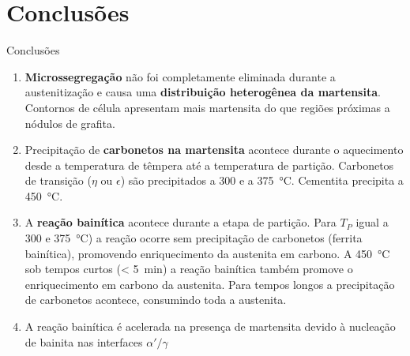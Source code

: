 \section{Conclusões}

\begin{frame}{Conclusões}

  \begin{enumerate}
    \item \textbf{Microssegregação} não foi completamente eliminada durante a austenitização e causa uma \textbf{distribuição heterogênea da martensita}. Contornos de célula apresentam mais martensita do que regiões próximas a nódulos de grafita.

    \item Precipitação de \textbf{carbonetos na martensita} acontece durante o aquecimento desde a temperatura de têmpera até a temperatura de partição. Carbonetos de transição ($\eta$ ou $\epsilon$) são precipitados a 300 e a \SI{375}{\degreeCelsius}. Cementita precipita a \SI{450}{\degreeCelsius}.

    \item A \textbf{reação bainítica} acontece durante a etapa de partição. Para $T_P$ igual a 300 e \SI{375}{\degreeCelsius}) a reação ocorre sem precipitação de carbonetos (ferrita bainítica), promovendo enriquecimento da austenita em carbono. A \SI{450}{\degreeCelsius} sob tempos curtos (< 5~min) a reação bainítica também promove o enriquecimento em carbono da austenita. Para tempos longos a precipitação de carbonetos acontece, consumindo toda a austenita.

    \item A reação bainítica é acelerada na presença de martensita devido à nucleação de bainita nas interfaces $\alpha'/\gamma$

    \seti
  \end{enumerate}
\end{frame}

